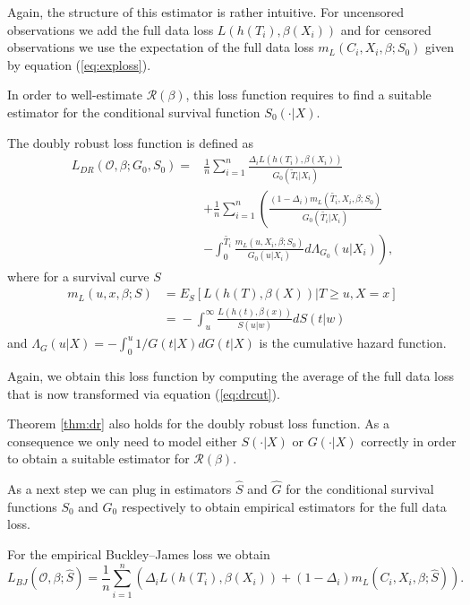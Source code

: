 \documentclass[12pt, a4paper]{scrartcl}
\theoremstyle{definition}
\theoremstyle{plain}
\numberwithin{equation}{section}
\numberwithin{figure}{section}
\numberwithin{table}{section}
\begin{document}
	Again, the structure of this estimator is rather intuitive.
	For uncensored observations we add the full data loss $L(h(T_i), \beta(X_i))$ and for censored observations we use the expectation of the full data loss $m_L(C_i, X_i, \beta; S_0)$ given by equation (\ref{eq:exploss}).
	
	In order to well-estimate $\mathcal{R}(\beta)$, this loss function requires to find a suitable estimator for the conditional survival function $S_0(\cdot\vert X)$.
	
	The doubly robust loss function is defined as
	\begin{equation}\label{eq:dr}
	\begin{split}
		L_{DR}(\mathcal{O}, \beta; G_0, S_0) ={} & \frac{1}{n} \sum_{i=1}^n \frac{\Delta_i L(h(T_i),\beta(X_i))}{G_0(\tilde{T}_i\vert X_i)}\\
		~ & + \frac{1}{n} \sum_{i=1}^n \left(\frac{(1-\Delta_i)m_L(\tilde{T_i}, X_i, \beta; S_0)}{G_0(\tilde{T_i}\vert X_i)} \right.\\
		& - \left. \int _0^{\tilde{T_i}} \frac{m_L(u, X_i, \beta; S_0)}{G_0(u \vert X_i)} d \Lambda_{G_0}(u \vert X_i) \right),
	\end{split}
	\end{equation}
	where for a survival curve $S$
	\begin{equation}\label{eq:exploss}
	\begin{split}
		m_L(u,x,\beta; S) &={} E_S[L(h(T), \beta(X)) \vert T \geq u, X = x]\\
		&={} - \int_u^{\infty} \frac{L(h(t), \beta(x))}{S(u \vert w)} dS(t\vert w)
	\end{split}
	\end{equation}
	and $\Lambda_G(u\vert X) = - \int_0^u  1/ G(t\vert X)dG(t \vert X)$ is the cumulative hazard function.
	
	Again, we obtain this loss function by computing the average of the full data loss that is now transformed via equation (\ref{eq:drcut}).
	
	Theorem \ref{thm:dr} also holds for the doubly robust loss function.
	As a consequence we only need to model either $S(\cdot\vert X)$ or $G(\cdot\vert X)$ correctly in order to obtain a suitable estimator for $\mathcal{R}(\beta)$.
	
	As a next step we can plug in estimators $\hat{S}$ and $\hat{G}$ for the conditional survival functions $S_0$ and $G_0$ respectively to obtain empirical estimators for the full data loss.
	
	For the empirical Buckley--James loss we obtain
	\begin{equation*}
	L_{BJ}(\mathcal{O}, \beta; \hat{S}) = \frac{1}{n} \sum_{i=1}^n \left( \Delta_i L(h(T_i), \beta(X_i))+(1-\Delta_i)m_L(C_i, X_i, \beta; \hat{S})\right).
	\end{equation*}
	
\end{document}
